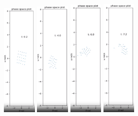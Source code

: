 \documentclass[11pt]{article} %
\begin{document}
    \begin{figure}[H]
        \centering
        \includegraphics[width=0.15\textwidth]{phase_0A.png}
        \includegraphics[width=0.15\textwidth]{phase_1A.png}
        \includegraphics[width=0.15\textwidth]{phase_2A.png}
        \includegraphics[width=0.15\textwidth]{phase_3A.png}

\end{figure}
\end{document}
